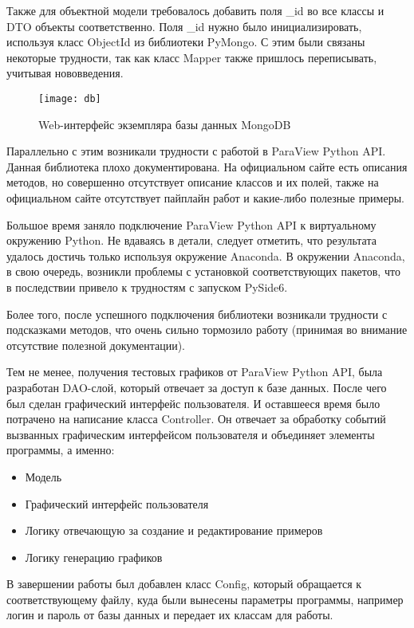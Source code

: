 \documentclass[14pt]{extreport}
\begin{document}
Также для объектной модели требовалось добавить поля \_id во все классы и DTO объекты соответственно. Поля \_id нужно было инициализировать, используя класс ObjectId из библиотеки PyMongo. С этим были связаны некоторые трудности, так как класс Mapper также пришлось переписывать, учитывая нововведения.


\begin{figure}[H]
	\centerline{\texttt{[image: db]}}
	\caption{Web-интерфейс экземпляра базы данных MongoDB}
	\label{figdb}
\end{figure}

Параллельно с этим возникали трудности с работой в ParaView Python API. Данная библиотека плохо документирована. На официальном сайте есть описания методов, но совершенно отсутствует описание классов и их полей, также на официальном сайте отсутствует пайплайн работ и какие-либо полезные примеры.

Большое время заняло подключение ParaView Python API к виртуальному окружению Python. Не вдаваясь в детали, следует отметить, что результата удалось достичь только используя окружение Anaconda. В окружении Anaconda, в свою очередь, возникли проблемы с установкой соответствующих пакетов, что в последствии привело к трудностям с запуском PySide6. 

Более того, после успешного подключения библиотеки возникали трудности с подсказками методов, что очень сильно тормозило работу (принимая во внимание отсутствие полезной документации).

Тем не менее, получения тестовых графиков от ParaView Python API, была разработан DAO-слой, который отвечает за доступ к базе данных. После чего был сделан графический интерфейс пользователя. И оставшееся время было потрачено на написание класса Controller. Он отвечает за обработку событий вызванных графическим интерфейсом пользователя и объединяет элементы программы, а именно: 
\begin{itemize}
	\item Модель
	\item Графический интерфейс пользователя
	\item Логику отвечающую за создание и редактирование примеров
	\item Логику генерацию графиков
\end{itemize}

В завершении работы был добавлен класс Config, который обращается к соответствующему файлу, куда были вынесены параметры программы, например логин и пароль от базы данных и передает их классам для работы.
\end{document}
